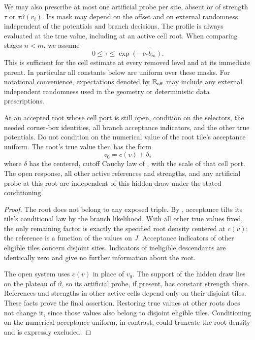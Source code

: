 We may also prescribe at most one artificial probe per site, absent or
of strength $\tau$ or $\tau\vartheta(v_i)$.  Its mask may depend on the
offset and on external randomness independent of the potentials and
branch decisions.  The profile is always evaluated at the true value,
including at an active cell root.  When comparing stages $n<m$, we
assume
\begin{equation}
 0\le\tau\le\exp(-c_*b_m).
 \label{hier:probe-range}
\end{equation}
This is sufficient for the cell estimate at every removed level and at
its immediate parent.  In particular all constants below are uniform
over these masks.  For notational convenience, expectations denoted by
$\mathbb E_{\rm off}$ may include any external independent randomness used in
the geometry or deterministic data prescriptions.

\begin{lemma}
\label{hier:hidden}
At an accepted root whose cell port is still open, condition on the
selectors, the needed corner-box identities, all branch acceptance
indicators, and the other true potentials.  Do not condition on the
numerical value of the root tile's acceptance uniform.  The root's true
value then has the form
\[
                 v_0=c(v)+\delta,
\]
where $\delta$ has the centered, cutoff Cauchy law of
, with the scale of that cell port.  The open response,
all other active references and strengths, and any artificial probe at
this root are independent of this hidden draw under the stated
conditioning.
\end{lemma}

\begin{proof}
The root does not belong to any exposed triple.  By
, acceptance tilts its tile's conditional law by
the branch likelihood.  With all other true values fixed, the only
remaining factor is exactly the specified root density centered at
$c(v)$; the reference is a function of the values on $J$.  Acceptance
indicators of other eligible tiles concern disjoint sites.  Indicators
of ineligible descendants are identically zero and give no further
information about the root.

The open system uses $c(v)$ in place of $v_0$.  The support of the hidden
draw lies on the plateau of $\vartheta$, so its artificial probe, if
present, has constant strength there.  References and strengths in
other active cells depend only on their disjoint tiles.  These facts
prove the final assertion.  Restoring true values at other roots does
not change it, since those values also belong to disjoint eligible
tiles.  Conditioning on the numerical acceptance uniform, in contrast,
could truncate the root density and is expressly excluded.
\end{proof}


